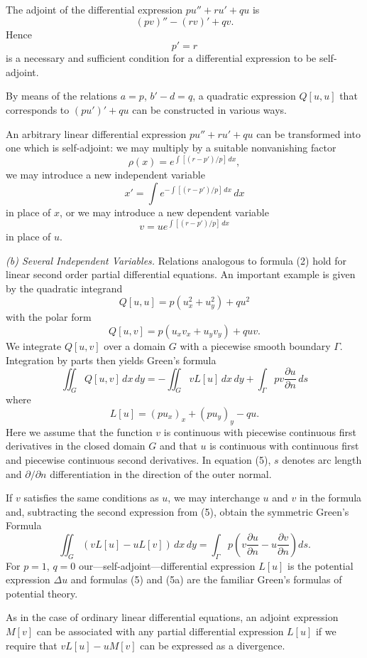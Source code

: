 The adjoint of the differential expression $pu''+ru'+qu$ is
\[
(pv)''-(rv)'+qv.
\]
Hence
\[
p'=r
\]
is a necessary and sufficient condition for a differential expression to be self-adjoint.

By means of the relations $a=p$, $b'-d=q$, a quadratic expression $Q[u,u]$ that corresponds to $(pu')'+qu$ can be constructed in various ways.

An arbitrary linear differential expression $pu''+ru'+qu$ can be transformed into one which is self-adjoint: we may multiply by a suitable nonvanishing factor
\[
\rho(x)=e^{\int[(r-p')/p]\,dx},
\]
we may introduce a new independent variable
\[
x'=\int e^{-\int[(r-p')/p]\,dx}\,dx
\]
in place of $x$, or we may introduce a new dependent variable
\[
v=ue^{\int[(r-p')/p]\,dx}
\]
in place of $u$.

\textit{(b) Several Independent Variables.} Relations analogous to formula (2) hold for linear second order partial differential equations. An important example is given by the quadratic integrand
\[
Q[u,u]=p(u_x^2+u_y^2)+qu^2
\]
with the polar form
\[
Q[u,v]=p(u_xv_x+u_yv_y)+quv.
\]
We integrate $Q[u,v]$ over a domain $G$ with a piecewise smooth boundary $\Gamma$. Integration by parts then yields Green's formula
\begin{equation}\tag{5}
\iint_G Q[u,v] \, dx\,dy=-\iint_G vL[u] \, dx\,dy+\int_\Gamma pv\frac{\partial u}{\partial n}\,ds
\end{equation}
where
\[
L[u]=(pu_x)_x+(pu_y)_y-qu.
\]
Here we assume that the function $v$ is continuous with piecewise continuous first derivatives in the closed domain $G$ and that $u$ is continuous with continuous first and piecewise continuous second derivatives. In equation (5), $s$ denotes arc length and $\partial/\partial n$ differentiation in the direction of the outer normal.

If $v$ satisfies the same conditions as $u$, we may interchange $u$ and $v$ in the formula and, subtracting the second expression from (5), obtain the symmetric Green's Formula
\begin{equation}\tag{5a}
\iint_G(vL[u]-uL[v])\,dx\,dy=\int_\Gamma p\left(v\frac{\partial u}{\partial n}-u\frac{\partial v}{\partial n}\right)ds.
\end{equation}
For $p=1$, $q=0$ our---self-adjoint---differential expression $L[u]$ is the potential expression $\Delta u$ and formulas (5) and (5a) are the familiar Green's formulas of potential theory.

As in the case of ordinary linear differential equations, an adjoint expression $M[v]$ can be associated with any partial differential expression $L[u]$ if we require that $vL[u]-uM[v]$ can be expressed as a divergence.

